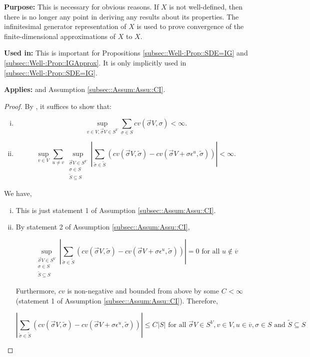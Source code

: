 \documentclass[12pt]{article}
\newcommand{\ov}{\overline}
\newcommand{\te}{\text}
\newcommand{\ep}{\epsilon}
\newcommand{\purpose}{\textbf{Purpose: }}
\newcommand{\usein}{\textbf{Used in: }}
\newcommand{\app}{\textbf{Applies: }}
\renewcommand{\v}{v}							%
\newcommand{\vv}{u}								%
\renewcommand{\S}{S}							%
\newcommand{\s}{\sigma}							%
\newcommand{\sv}{\vec{\s}}						%
\newcommand{\ev}[1]{\ep^{#1}}					%
\newcommand{\X}{X}								%
\newcommand{\IGr}{c}							%
\newcommand{\cl}{\ov}							%
\renewcommand{\ss}[1]{^{#1}}					%
\renewcommand{\SS}{\tilde{\S}}						%
\renewcommand{\ss}{\tilde{\s}}					%
\newcommand{\XState}[1]{\S^{#1}}				%
\newcommand{\const}[1]{C_{#1}}						%
\begin{document}
\purpose This is necessary for obvious reasons. If \(\X{}{}\) is not well-defined, then there is no longer any point in deriving any results about its properties. The infinitesimal generator representation of \(\X{}{}\) is used to prove convergence of the finite-dimensional approximations of \(\X{}{}\) to \(\X{}{}\).

\usein This is important for Propositions \ref{subsec::Well-:Prop::SDE=IG} and \ref{subsec::Well-:Prop::IGApprox}. It is only implicitly used in \ref{subsec::Well-:Prop::SDE=IG}.

\app \cite[Theorem 3.9]{Lig85} and Assumption \ref{subsec::Assum:Assu::CI}.

\begin{proof}
By \cite[Theorem 3.9 (a) and (b)]{Lig85}, it suffices to show that:

\begin{enumerate}[i)]
\item 

\[\sup_{\v \in  V,\sv{}{ V} \in \S^ V} \sum_{\s \in \S} \IGr{\v}(\sv{}{ V},\s) < \infty.\]

\item 

\[\sup_{\v\in  V}\sum_{\vv\neq \v} \sup_{\substack{\sv{}{ V} \in \S^ V\\ \s\in \S\\ \SS \subseteq \S}} \left|\sum_{\ss \in \SS} (\IGr{\v}(\sv{}{ V},\ss) - \IGr{\v}(\sv{}{ V}+\s \ev{\vv},\ss))\right| < \infty.\]
\end{enumerate}

We have,

\begin{enumerate}[i)]
\item This is just statement 1 of Assumption \ref{subsec::Assum:Assu::CI}.

\item By statement 2 of Assumption \ref{subsec::Assum:Assu::CI}, 

\[\sup_{\substack{\sv{}{ V} \in \S^ V\\ \s\in \S\\ \SS\subseteq \S}} \left|\sum_{\ss \in \SS} (\IGr{\v}(\sv{}{ V},\ss) - \IGr{\v}(\sv{}{ V}+\s \ev{\vv},\ss))\right| = 0 \te{ for all } \vv \notin \cl{\v}\]

Furthermore, \(\IGr{\v}\) is non-negative and bounded from above by some \(\const{} < \infty\) (statement 1 of Assumption \ref{subsec::Assum:Assu::CI}). Therefore, 

\[\left|\sum_{\ss \in \SS} (\IGr{\v}(\sv{}{ V},\ss) - \IGr{\v}(\sv{}{ V}+\s\ev{\vv},\ss))\right| \leq \const{}|\S| \te{ for all } \sv{}{ V} \in \S^ V,\v \in  V, \vv \in \cl{\v}, \s \in \S \te{ and } \SS\subseteq \S\]


\end{enumerate}
\end{proof}
\end{document}
